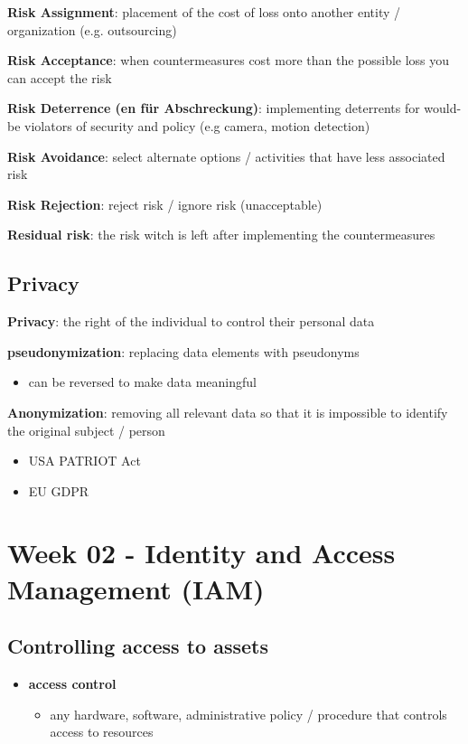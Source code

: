 \documentclass[11pt,twoside,landscape]{article}
\begin{document}
\begin{multicols}{4}
\textbf{Risk Assignment}: placement of the cost of loss onto another entity / organization (e.g. outsourcing)

\textbf{Risk Acceptance}: when countermeasures cost more than the possible loss you can accept the risk

\textbf{Risk Deterrence (en für Abschreckung)}: implementing deterrents for would-be violators of security and policy (e.g camera, motion detection)

\textbf{Risk Avoidance}: select alternate options / activities that have less associated risk

\textbf{Risk Rejection}: reject risk / ignore risk (unacceptable)

\textbf{Residual risk}: the risk witch is left after implementing the countermeasures

\subsection*{Privacy}
\label{sec:org803030c}
\textbf{Privacy}: the right of the individual to control their personal data

\textbf{pseudonymization}: replacing data elements with pseudonyms
\begin{itemize}
\item can be reversed to make data meaningful
\end{itemize}

\textbf{Anonymization}: removing all relevant data so that it is impossible to identify the original subject / person

\begin{itemize}
\item USA PATRIOT Act
\item EU GDPR
\end{itemize}

\section*{Week 02 - Identity and Access Management (IAM)}
\label{sec:org97a6a8a}
\subsection*{Controlling access to assets}
\label{sec:org0265324}
\begin{itemize}
\item \textbf{access control}
\begin{itemize}
\item any hardware, software, administrative policy / procedure that controls access to resources
\end{itemize}


\end{itemize}
\end{multicols}
\end{document}
